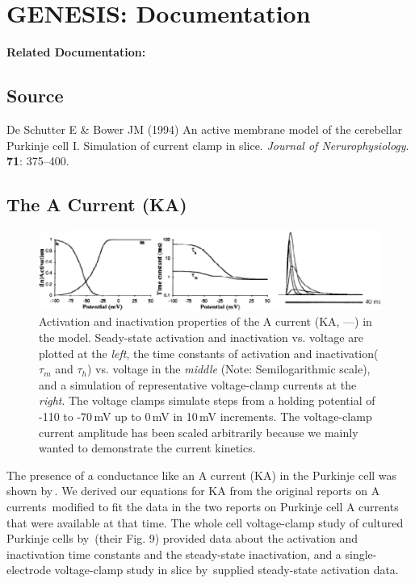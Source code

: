 \documentclass[12pt]{article}
\begin{document}
\section*{GENESIS: Documentation}

{\bf Related Documentation:}

\subsection*{Source}

De Schutter E \& Bower JM (1994) An active membrane model of the cerebellar Purkinje cell I. Simulation of current clamp in slice. {\it Journal of Nerurophysiology}. {\bf 71}: 375--400. \\

\subsection*{The A Current (KA)}

\begin{figure}[h]
\centering
   \includegraphics[scale=0.75]{figures/DS1.2F.eps}
   \caption{Activation and inactivation properties of the A current (KA, ---) in the model. Seady-state activation and inactivation vs. voltage are plotted at the {\em left}, the time constants of activation and inactivation($\tau_m$ and $\tau_h$) vs. voltage in the {\em middle} (Note: Semilogarithmic scale), and a simulation of representative voltage-clamp currents at the {\em right}. The voltage clamps simulate steps from a holding potential of -110 to -70\,mV up to 0\,mV in 10\,mV increments. The voltage-clamp current amplitude has been scaled arbitrarily because we mainly wanted to demonstrate the current kinetics.}
   \label{fig:DS1.2F}
\end{figure}

The presence of a conductance like an A current (KA) in the Purkinje cell was shown by\,\cite{Hounsgaard:1988nx}. We derived our equations for KA from the original reports on A currents\,\cite{Connor:1971tg, De-Schutter:1986hc} modified to fit the data in the two reports on Purkinje cell A currents that were available at that time. The whole cell voltage-clamp study of cultured Purkinje cells by\,\cite{Hirano:1989uq} (their Fig. 9) provided data about the activation and inactivation time constants and the steady-state inactivation, and a single-electrode voltage-clamp study in slice by\,\cite{Li:1990ij} supplied steady-state activation data.
\end{document}
